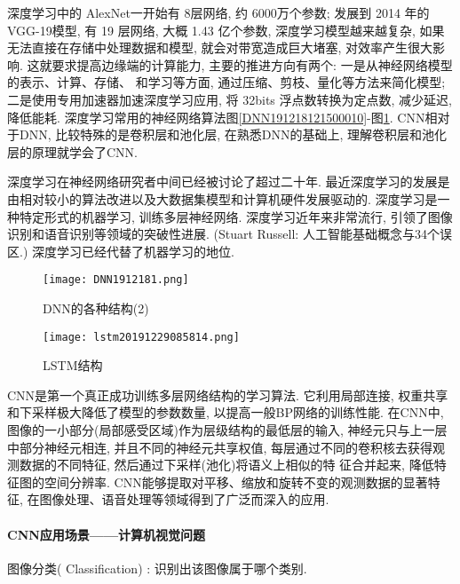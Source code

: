 深度学习中的 AlexNet一开始有 8层网络, 约 6000万个参数; 发展到 2014 年的 VGG-19模型, 有 19 层网络, 大概 1.43 亿个参数, 深度学习模型越来越复杂, 如果无法直接在存储中处理数据和模型, 就会对带宽造成巨大堵塞, 对效率产生很大影响.
这就要求提高边缘端的计算能力, 主要的推进方向有两个:  一是从神经网络模型的表示、计算、存储、 和学习等方面, 通过压缩、剪枝、量化等方法来简化模型;  二是使用专用加速器加速深度学习应用, 将 32bits 浮点数转换为定点数, 减少延迟, 降低能耗.
深度学习常用的神经网络算法图\ref{DNN191218121500010}-图\ref{DNN191218121500011}. CNN相对于DNN, 比较特殊的是卷积层和池化层, 在熟悉DNN的基础上, 理解卷积层和池化层的原理就学会了CNN.

深度学习在神经网络研究者中间已经被讨论了超过二十年. 最近深度学习的发展是由相对较小的算法改进以及大数据集模型和计算机硬件发展驱动的.
深度学习是一种特定形式的机器学习, 训练多层神经网络. 深度学习近年来非常流行, 引领了图像识别和语音识别等领域的突破性进展. (Stuart Russell: 人工智能基础概念与34个误区.)
深度学习已经代替了机器学习的地位.
\begin{figure}[H]
    \centering
    \texttt{[image: DNN1912181.png]}
    \caption{DNN的各种结构(2)}
    \label{DNN191218121500011}
    \vspace{-0.4cm}
\end{figure}
\begin{figure}[H]
    \centering
    \texttt{[image: lstm20191229085814.png]}
    \caption{LSTM结构}
    \label{lstm20191229085814}
    \vspace{-0.4cm}
\end{figure}
CNN是第一个真正成功训练多层网络结构的学习算法. 它利用局部连接, 权重共享和下采样极大降低了模型的参数数量, 以提高一般BP网络的训练性能.
在CNN中, 图像的一小部分(局部感受区域)作为层级结构的最低层的输入, 神经元只与上一层中部分神经元相连, 并且不同的神经元共享权值, 每层通过不同的卷积核去获得观测数据的不同特征, 然后通过下采样(池化)将语义上相似的特
征合并起来, 降低特征图的空间分辨率.  CNN能够提取对平移、缩放和旋转不变的观测数据的显著特征, 在图像处理、语音处理等领域得到了广泛而深入的应用.
\paragraph{CNN应用场景——计算机视觉问题}

 图像分类( Classification) : 识别出该图像属于哪个类别.

